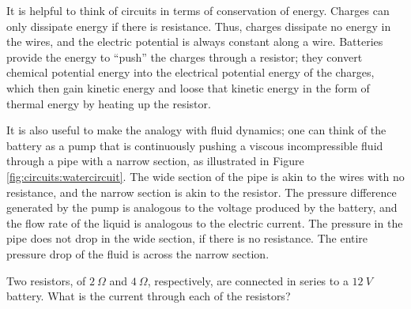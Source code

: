 It is helpful to think of circuits in terms of conservation of energy. Charges can only dissipate energy if there is resistance. Thus, charges dissipate no energy in the wires, and the electric potential is always constant along a wire. Batteries provide the energy to ``push'' the charges through a resistor; they convert chemical potential energy into the electrical potential energy of the charges, which then gain kinetic energy and loose that kinetic energy in the form of thermal energy by heating up the resistor.

It is also useful to make the analogy with fluid dynamics; one can think of the battery as a pump that is continuously pushing a viscous incompressible fluid through a pipe with a narrow section, as illustrated in Figure \ref{fig:circuits:watercircuit}. The wide section of the pipe is akin to the wires with no resistance, and the narrow section is akin to the resistor. The pressure difference generated by the pump is analogous to the voltage produced by the battery, and the flow rate of the liquid is analogous to the electric current. The pressure in the pipe does not drop in the wide section, if there is no resistance. The entire pressure drop of the fluid is across the narrow section.
\begin{example}{Two resistors, of $\SI{2}{\Omega}$ and $\SI{4}{\Omega}$, respectively, are connected in series to a $\SI{12}{V}$ battery. What is the current through each of the resistors?}
\end{example}


